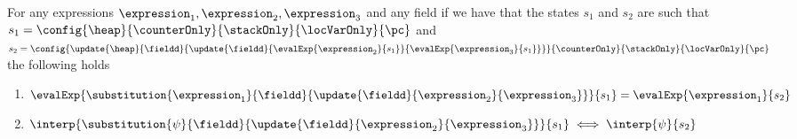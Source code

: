 \begin{substHeap}\label{substHeap}
For any expressions $ \expression_1, \expression_2, \expression_3 $ and any field \fieldd
if we have that the states $s_1$ and $s_2$ are such that
 $s_1 =   \config{\heap}{\counterOnly}{ \stackOnly }{\locVarOnly}{\pc }$ and \\
  $s_2 =  \config{ \update{\heap}{\fieldd }{\update{\fieldd}
                                                   {\evalExp{\expression_2}{ s_1 } }
                                                   {\evalExp{ \expression_3}{ s_1 } } } }
                                          {\counterOnly}{ \stackOnly }{\locVarOnly}{\pc }   $  the following holds
\begin{enumerate}
  \item $ \evalExp{\substitution{\expression_1}{\fieldd}{ \update{ \fieldd  }{\expression_2}{\expression_3} }}{ s_1 } =  \evalExp{\expression_1}{ s_2  }  $
  \item $ \interp{\substitution{\psi}{\fieldd}{ \update{ \fieldd  }{\expression_2}{\expression_3} }}{ s_1 } \iff  \interp{\psi}{ s_2  }  $
\end{enumerate}
\end{substHeap}

